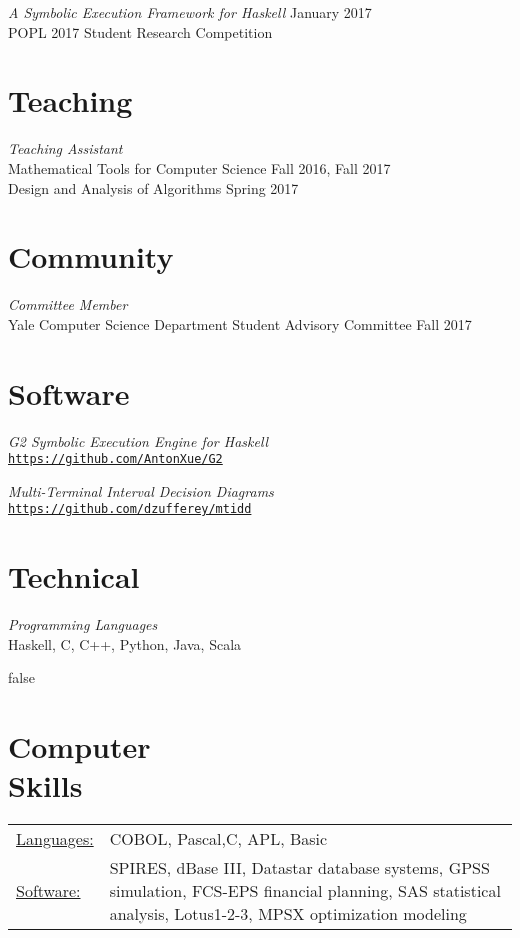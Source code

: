 \documentclass[margin]{res}
\begin{document}
\begin{resume}
\textit{A Symbolic Execution Framework for Haskell} \hfill January 2017 \\
POPL 2017 Student Research Competition

\section{Teaching}
\textit{Teaching Assistant} \\
  Mathematical Tools for Computer Science \hfill Fall 2016, Fall 2017 \\
  Design and Analysis of Algorithms \hfill Spring 2017

\section{Community}
\textit{Committee Member} \\
Yale Computer Science Department Student Advisory Committee \hfill Fall 2017

\section{Software}
\textit{G2 Symbolic Execution Engine for Haskell} \\
\href{https://github.com/AntonXue/G2}{\texttt{https://github.com/AntonXue/G2}}

\textit{Multi-Terminal Interval Decision Diagrams} \\
\href{https://github.com/dzufferey/mtidd}{\texttt{https://github.com/dzufferey/mtidd}}

\section{Technical}
\textit{Programming Languages} \\
Haskell, C, C++, Python, Java, Scala
 

\if false
\section{Computer \\ Skills}
   \begin{tabular}{l p{3in}}
    \underline{Languages:} & COBOL, Pascal,C, APL, Basic \\

     \underline{Software:} &  SPIRES, dBase III, Datastar database 
                        systems, GPSS simulation, FCS-EPS financial 
                        planning, SAS statistical analysis, 
                        Lotus1-2-3, MPSX optimization modeling 
   \end{tabular}
 \fi

\end{resume} 
\end{document}
